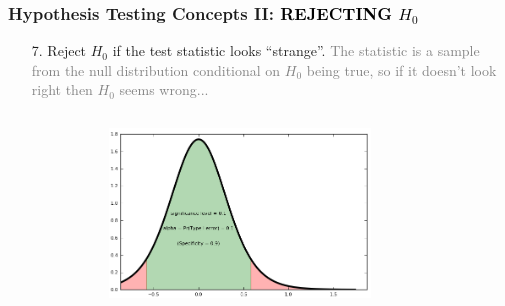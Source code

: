 \documentclass[xcolor={dvipsnames}]{beamer}
\begin{document}
\frame
{
 \frametitle{Hypothesis Testing Concepts II: \textcolor{black}{\textbf{REJECTING} $H_0$}}

 \vspace{-1em}
 
\begin{enumerate}
\item[7.] Reject $H_0$ if the test statistic \textcolor{NavyBlue}{looks ``strange''}. \textcolor{gray}{The statistic is a sample from the null distribution conditional on $H_0$ being true, so if it doesn't look right then $H_0$ seems wrong...}
\end{enumerate}

 \vspace{-2.75em}

 
\begin{columns}
\begin{column}{.185\textwidth}
\end{column}
\begin{column}{.615\textwidth}
  
 \begin{figure}
\centering
\hspace*{-.28em}\includegraphics[width=2.73in]{stuff/tests_1.png}
\end{figure}

\vspace{-.388in}
\end{column}
\begin{column}{.2\textwidth}

\end{column}
\end{columns}

 \vspace{1em}

\color{white}

\vspace{-.5em}


}
\end{document}

